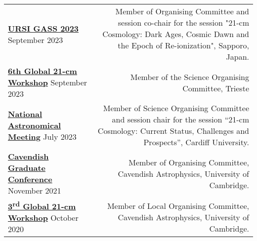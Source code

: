 \documentclass{article}
\begin{document}
\begin{tabular}{l!{\vrule}r}
    \href{https://www.ursi-gass2023.jp}{\textbf{URSI GASS 2023}} September 2023 & Member of Organising Committee and session co-chair for the session "21-cm Cosmology: Dark Ages, Cosmic Dawn and the Epoch of Re-ionization", Sapporo, Japan. \\
    \href{https://global21cmworkshop.org/2023-ifpu/}{\textbf{6th Global 21-cm Workshop}} September 2023 & Member of the Science Organising Committee, Trieste \\
    \href{https://nam2023.org}{\textbf{National Astronomical Meeting}} July 2023 & Member of Science Organising Committee and session chair for the session “21-cm Cosmology: Current Status, Challenges and Prospects”, Cardiff University. \\
	\href{http://cavgradcon.soc.srcf.net/index.html}{\textbf{Cavendish Graduate Conference}} November 2021 & Member of Organising Committee, Cavendish Astrophysics, University of Cambridge.\\
	\href{https://sites.google.com/view/third21cmglobalworkshop/home?authuser=0}{\textbf{3\textsuperscript{rd} Global 21-cm Workshop}} October 2020 & Member of Local Organising Committee, Cavendish Astrophysics, University of Cambridge.	
\end{tabular}

\end{document}
